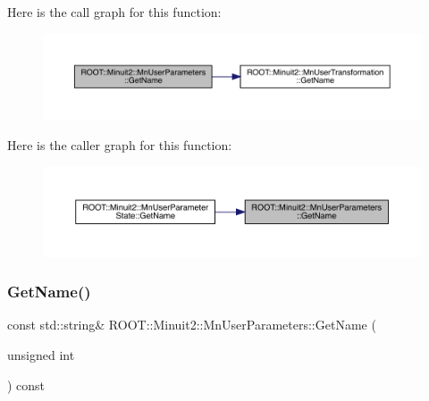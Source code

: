 Here is the call graph for this function\+:
\nopagebreak
\begin{figure}[H]
\begin{center}
\leavevmode
\includegraphics[width=350pt]{d6/d10/classROOT_1_1Minuit2_1_1MnUserParameters_a83594fef03edc5f0948e05a290e67fc2_cgraph}
\end{center}
\end{figure}
Here is the caller graph for this function\+:
\nopagebreak
\begin{figure}[H]
\begin{center}
\leavevmode
\includegraphics[width=350pt]{d6/d10/classROOT_1_1Minuit2_1_1MnUserParameters_a83594fef03edc5f0948e05a290e67fc2_icgraph}
\end{center}
\end{figure}
\mbox{\label{classROOT_1_1Minuit2_1_1MnUserParameters_a6061d066b67d33c98eb6d9ba36b8e269}} 
\subsubsection{\texorpdfstring{GetName()}{GetName()}\hspace{0.1cm}{\footnotesize\ttfamily [2/3]}}
{\footnotesize\ttfamily const std\+::string\& R\+O\+O\+T\+::\+Minuit2\+::\+Mn\+User\+Parameters\+::\+Get\+Name (\begin{DoxyParamCaption}\item[{unsigned int}]{ }\end{DoxyParamCaption}) const}

\mbox{\label{classROOT_1_1Minuit2_1_1MnUserParameters_a6061d066b67d33c98eb6d9ba36b8e269}} 
